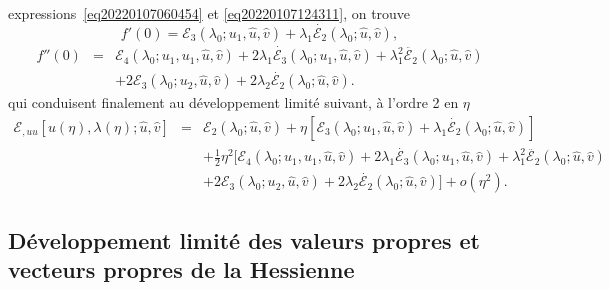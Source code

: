 \documentclass[12pt, final]{amsart}
\begin{document}
expressions~\eqref{eq20220107060454} et \eqref{eq20220107124311}, on trouve
\begin{equation}
  f' (0) =\mathcal{E}_3 (\lambda_0 ; u_1, \hat{u}, \hat{v}) + \lambda_1
  \dot{\mathcal{E}_2} (\lambda_0 ; \hat{u}, \hat{v}),
\end{equation}
\begin{eqnarray}
  f'' (0) & = & \mathcal{E}_4 (\lambda_0 ; u_1, u_1, \hat{u}, \hat{v}) + 2
  \lambda_1  \dot{\mathcal{E}_3} (\lambda_0 ; u_1, \hat{u}, \hat{v}) +
  \lambda_1^2  \ddot{\mathcal{E}_2} (\lambda_0 ; \hat{u}, \hat{v}) \nonumber\\
  &  &  + 2\mathcal{E}_3 (\lambda_0 ; u_2, \hat{u}, \hat{v}) + 2
  \lambda_2  \dot{\mathcal{E}_2} (\lambda_0 ; \hat{u}, \hat{v}) .
\end{eqnarray}
qui conduisent finalement au développement limité suivant, à
l'ordre 2 en $\eta$
\begin{eqnarray}
  \mathcal{E}_{, u  u} [u (\eta), \lambda (\eta) ; \hat{u}, \hat{v}] &
  = & \mathcal{E}_2 (\lambda_0 ; \hat{u}, \hat{v}) + \eta [\mathcal{E}_3
  (\lambda_0 ; u_1, \hat{u}, \hat{v})   + \lambda_1
  \dot{\mathcal{E}_2} (\lambda_0 ; \hat{u}, \hat{v})] \nonumber\\
  &  &  + \tfrac{1}{2} \eta^2  [\mathcal{E}_4 (\lambda_0 ; u_1, u_1,
  \hat{u}, \hat{v})  + 2 \lambda_1  \dot{\mathcal{E}_3} (\lambda_0 ;
  u_1, \hat{u}, \hat{v}) + \lambda_1^2  \ddot{\mathcal{E}_2} (\lambda_0 ;
  \hat{u}, \hat{v}) \nonumber\\
  &  &   + 2\mathcal{E}_3 (\lambda_0 ; u_2, \hat{u},
  \hat{v}) + 2 \lambda_2  \dot{\mathcal{E}_2} (\lambda_0 ; \hat{u}, \hat{v})]
  + o (\eta^2) .
\end{eqnarray}

\subsection{Développement limité des valeurs propres et vecteurs
propres de la Hessienne}
\end{document}
